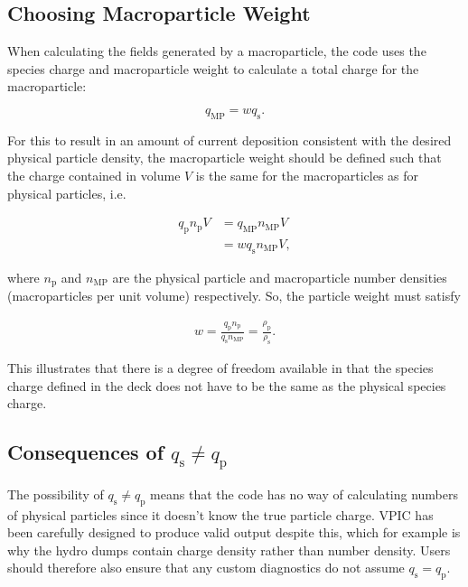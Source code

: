 \documentclass[twocolumn,10pt]{article}
\begin{document}
	\subsection{Choosing Macroparticle Weight}
	When calculating the fields generated by a macroparticle, the code uses the species charge and macroparticle weight to calculate a total charge for the macroparticle:

	\begin{equation}
		q_{\mathrm{MP}} = wq_{\mathrm{s}}.
	\end{equation}

	\noindent For this to result in an amount of current deposition consistent with the desired physical particle density, the macroparticle weight should be defined such that the charge contained in volume $V$ is the same for the macroparticles as for physical particles, i.e.

	\begin{align*}
		q_{\mathrm{p}}n_{\mathrm{p}}V &= q_{\mathrm{MP}}n_{\mathrm{MP}}V \\
			&= wq_{\mathrm{s}}n_{\mathrm{MP}}V,
	\end{align*}

	\noindent where $n_{\mathrm{p}}$ and $n_{\mathrm{MP}}$ are the physical particle and macroparticle number densities (macroparticles per unit volume) respectively. So, the particle weight must satisfy

	\begin{align}
		w = \frac{q_{\mathrm{p}}n_{\mathrm{p}}}{q_{\mathrm{s}}n_{\mathrm{MP}}} = \frac{\rho_{\mathrm{p}}}{\rho_{\mathrm{s}}}.
	\end{align}

	\noindent This illustrates that there is a degree of freedom available in that the species charge defined in the deck does not have to be the same as the physical species charge.

	\subsection{Consequences of $q_{\mathrm{s}} \neq q_{\mathrm{p}}$}

	The possibility of $q_{\mathrm{s}} \neq q_{\mathrm{p}}$ means that the code has no way of calculating numbers of physical particles since it doesn't know the true particle charge. VPIC has been carefully designed to produce valid output despite this, which for example is why the hydro dumps contain charge density rather than number density. Users should therefore also ensure that any custom diagnostics do not assume $q_{\mathrm{s}} = q_{\mathrm{p}}$.
\end{document}
